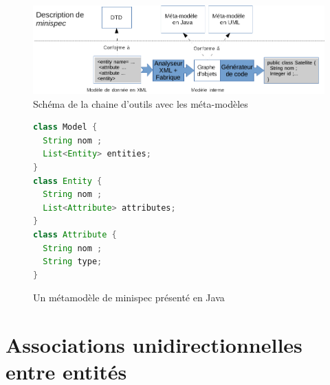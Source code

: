 \documentclass[12pt]{article}
\begin{document}
\begin{figure}
\begin{center}
\includegraphics[scale=0.5]{generation-code-3.png}
\end{center}
\caption{Schéma de la chaine d'outils avec les méta-modèles}
\label{fig:generation-code-3}
\end{figure} 

\begin{figure}
\begin{lstlisting}[language=java]
class Model {
  String nom ;
  List<Entity> entities;
}
class Entity {
  String nom ;
  List<Attribute> attributes;
}
class Attribute {
  String nom ;
  String type;
}
\end{lstlisting}
\caption{Un métamodèle de minispec présenté en Java}
\label{fig:meta-model-java1}
\end{figure} 

\section{Associations unidirectionnelles entre entités}
\end{document}
